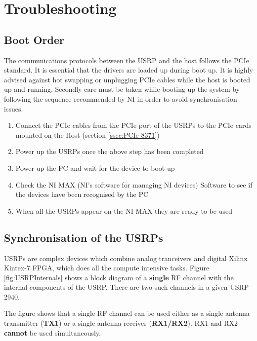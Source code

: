 \chapter{Troubleshooting}\label{ch:troubleshooting}
\section{Boot Order} \label{sec:BootOrder}
The communications protocols between the USRP and the host follows the PCIe standard. It is essential that the drivers are loaded up during boot up. It is highly advised against hot swapping or unplugging PCIe cables while the host is booted up and running. Secondly care must be taken while booting up the system by following the sequence recommended by NI in order to avoid synchronisation issues.

\begin{enumerate}
    \item Connect the PCIe cables from the PCIe port of the USRPs to the PCIe cards mounted on the Host (section \ref{ssec:PCIe-8371})
    \item Power up the USRPs once the above step has been completed
    \item Power up the PC and wait for the device to boot up
    \item Check the NI MAX (NI's software for managing NI devices) Software to see if the devices have been recognised by the PC
    \item When all the USRPs appear on the NI MAX they are ready to be used
\end{enumerate}

\section{Synchronisation of the USRPs} \label{sec:USRPSync}

USRPs are complex devices which combine analog tranceivers and digital Xilinx Kintex-7 FPGA, which does all the compute intensive tasks. Figure \ref{fig:USRPInternals} shows a block diagram of a \textbf{single} RF channel with the internal components of the USRP. There are two such channels in a given USRP 2940.

The figure shows that a single RF channel can be used either as a single antenna transmitter (\textbf{TX1}) or a single antenna receiver (\textbf{RX1/RX2}). RX1 and RX2 \textbf{cannot} be used simultaneously.


